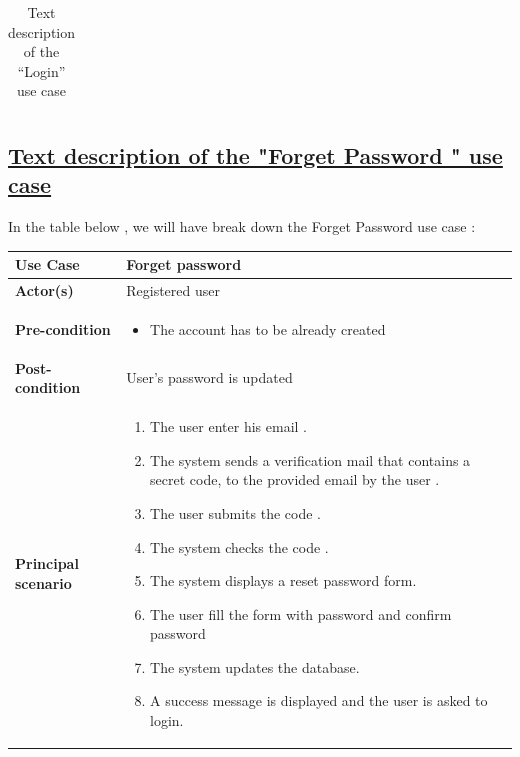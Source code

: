 \begin{table}[H]
\begin{tabular}{|p{}|p{}|}
\end{tabular}  
         \caption{Text description of the “Login” use case}
    \label{tab:my_label}
\end{table}

\subsection*{\textbf{\underline{Text description of the "Forget Password " use case}}}

\vspace{0.25cm}
In the table below , we will have break down the Forget Password use case : 

\begin{table}[H]
    \renewcommand{\arraystretch}{1.5}
    
   \begin{tabular}{|p{}|p{}|}
   \hline
     
        \textbf{Use Case} &Forget password  \\   \hline
        
        \textbf{Actor(s) } & Registered user  \\   \hline
        \textbf{Pre-condition} &  
        \begin{itemize}[left=0pt]
             \renewcommand\labelitemi{\textbf{\Huge .}}
            \item The account has to be already created
        \end{itemize} \\   \hline


        \textbf{Post-condition} & User's password is updated \\  \hline

                \textbf{Principal scenario} & 
                \begin{enumerate}[left=0pt]
                \item The user enter his email  .
                \item The system sends a verification mail that contains a secret code, to the provided email by the user  .
                \item The user submits the code .
                \item The system checks the code .
                \item The system displays a reset password form.
                \item The user fill the form with password and confirm password
                \item The system updates the database.
                \item A success message is displayed and the user is asked to login.
                \end{enumerate}  \\   \hline
                 

\end{tabular}
\end{table}
